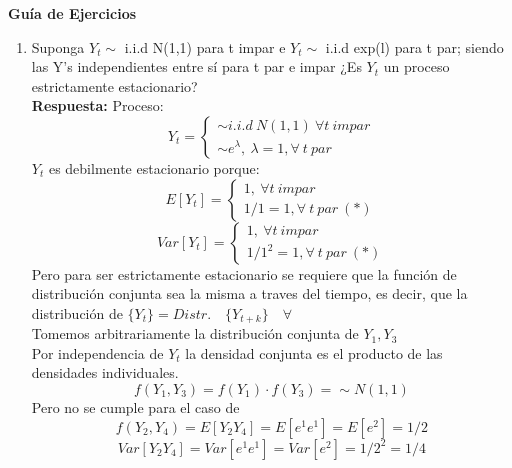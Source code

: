 \documentclass[12pt,letterpaper]{article}
\begin{document}
\begin{center}
\large\textbf{Gu\'ia de Ejercicios}
\end{center}
\begin{enumerate}
\item Suponga $Y_{t}\sim$  i.i.d N(1,1) para t impar e $Y_{t}\sim$ i.i.d exp(l) para t par; siendo las Y's independientes entre sí para t par e impar ¿Es $Y_{t}$ un proceso estrictamente estacionario?
    \\
    \textbf{Respuesta:} Proceso:
    \\
    \begin{equation*}
        Y_{t}=\left\lbrace\begin{array}{c}
        \sim i.i.d~N(1,1)~\forall t~impar \\
        \sim e^{\lambda},~\lambda=1, \forall~t~par
        \end{array}\right.
    \end{equation*}
    $Y_{t}$ es debilmente estacionario porque:
    \begin{equation*}
        E[Y_{t}]=\left\lbrace\begin{array}{c}
        1,~\forall t~impar \\
        1/1=1, \forall~t~par~(*)
            \end{array}\right.
    \end{equation*}
    \begin{equation*}
        Var[Y_{t}]=\left\lbrace\begin{array}{c}
        1,~\forall t~impar \\
        1/1^{2}=1, \forall~t~par~(*)
    \end{array}\right.
    \end{equation*}
    Pero para ser estrictamente estacionario se requiere que la función de distribución conjunta sea la misma a traves del tiempo, es decir, que la distribución de $\{Y_{t}\}=Distr.\quad\{Y_{t+k}\}\quad \forall$
    \\
    Tomemos arbitrariamente la distribución conjunta de $Y_{1},Y_{3}$
    \\
    Por independencia de $Y_{t}$ la densidad conjunta es el producto de las densidades individuales.
        \begin{equation*}
            f(Y_{1},Y_{3})=f(Y_{1})\cdot f(Y_{3})=\sim N(1,1)
        \end{equation*}
        Pero no se cumple para el caso de
        \begin{equation*}
            f(Y_{2},Y_{4})= E[Y_{2}Y_{4}]=E[e^{1}e^{1}]=E[e^{2}]=1/2
        \end{equation*}
        \begin{equation*}
            Var[Y_{2}Y_{4}]=Var[e^{1}e^{1}]=Var[e^{2}]=1/2^{2}=1/4
        \end{equation*}


\end{enumerate}
\end{document}
